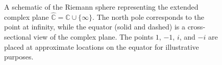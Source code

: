 \begin{figure}[H]
\centering
{}
\caption{A schematic of the Riemann sphere representing the extended complex plane 
\(\hat{\mathbb{C}} = \mathbb{C} \cup \{\infty\}\). The north pole corresponds to the 
point at infinity, while the equator (solid and dashed) is a cross-sectional view of 
the complex plane. The points \(1\), \(-1\), \(i\), and \(-i\) are placed at approximate 
locations on the equator for illustrative purposes.}
\label{fig:riemann-sphere-labeled}
\end{figure}



